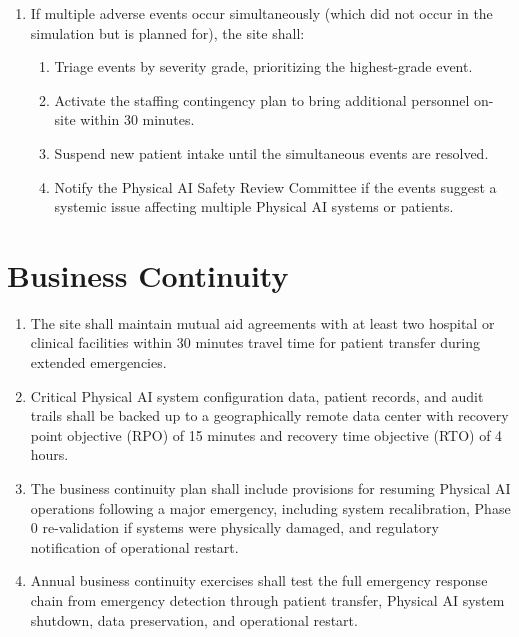 \documentclass[11pt,letterpaper]{article}
\begin{document}
\begin{enumerate}[label=(\alph*)]
\item If multiple adverse events occur simultaneously (which did not occur in
  the simulation but is planned for), the site shall:
  \begin{enumerate}[label=(\arabic*)]
  \item Triage events by severity grade, prioritizing the highest-grade event.
  \item Activate the staffing contingency plan to bring additional personnel
    on-site within 30 minutes.
  \item Suspend new patient intake until the simultaneous events are resolved.
  \item Notify the Physical AI Safety Review Committee if the events suggest
    a systemic issue affecting multiple Physical AI systems or patients.
  \end{enumerate}
\end{enumerate}

\section{Business Continuity}

\begin{enumerate}[label=(\alph*)]
\item The site shall maintain mutual aid agreements with at least two hospital
  or clinical facilities within 30 minutes travel time for patient transfer
  during extended emergencies.

\item Critical Physical AI system configuration data, patient records, and audit
  trails shall be backed up to a geographically remote data center with
  recovery point objective (RPO) of 15 minutes and recovery time objective
  (RTO) of 4 hours.

\item The business continuity plan shall include provisions for resuming
  Physical AI operations following a major emergency, including system
  recalibration, Phase 0 re-validation if systems were physically damaged,
  and regulatory notification of operational restart.

\item Annual business continuity exercises shall test the full emergency
  response chain from emergency detection through patient transfer, Physical
  AI system shutdown, data preservation, and operational restart.
\end{enumerate}
\end{document}
